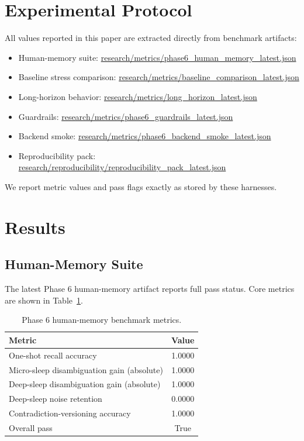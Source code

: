 \documentclass[11pt,a4paper]{article}
\begin{document}
\section{Experimental Protocol}
All values reported in this paper are extracted directly from benchmark artifacts:
\begin{itemize}[leftmargin=1.5em]
    \item Human-memory suite: \url{research/metrics/phase6_human_memory_latest.json}
    \item Baseline stress comparison: \url{research/metrics/baseline_comparison_latest.json}
    \item Long-horizon behavior: \url{research/metrics/long_horizon_latest.json}
    \item Guardrails: \url{research/metrics/phase6_guardrails_latest.json}
    \item Backend smoke: \url{research/metrics/phase6_backend_smoke_latest.json}
    \item Reproducibility pack: \url{research/reproducibility/reproducibility_pack_latest.json}
\end{itemize}

We report metric values and pass flags exactly as stored by these harnesses.

\section{Results}
\subsection{Human-Memory Suite}
The latest Phase 6 human-memory artifact reports full pass status. Core metrics are shown in Table~\ref{tab:human_suite}.

\begin{table}[htbp]
\centering
\caption{Phase 6 human-memory benchmark metrics.}
\label{tab:human_suite}
\begin{tabular}{@{}lc@{}}
\toprule
\textbf{Metric} & \textbf{Value} \\
\midrule
One-shot recall accuracy & 1.0000 \\
Micro-sleep disambiguation gain (absolute) & 1.0000 \\
Deep-sleep disambiguation gain (absolute) & 1.0000 \\
Deep-sleep noise retention & 0.0000 \\
Contradiction-versioning accuracy & 1.0000 \\
Overall pass & True \\
\bottomrule
\end{tabular}
\end{table}
\end{document}
